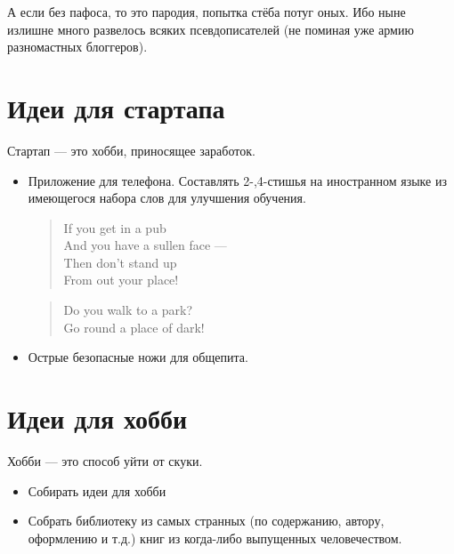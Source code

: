 \documentclass{ideas}
\begin{document}
 А если без пафоса, то это пародия, попытка стёба потуг оных. Ибо ныне излишне много развелось всяких псевдописателей (не поминая уже армию разномастных блоггеров).
\newpage
\section*{Идеи для стартапа}
Стартап --- это хобби, приносящее заработок.
\begin{itemize}
\item Приложение для телефона. Составлять 2-,4-стишья на иностранном языке из имеющегося набора слов для улучшения обучения.\\
\begin{flushleft}
\begin{verse}
If you get in a pub\\
And you have a sullen face ---\\ 
Then don't stand up\\
From out your place!
\end{verse}

\begin{verse}
Do you walk to a park?\\
Go round a place of dark! 
\end{verse}
\end{flushleft}
\item Острые безопасные ножи для общепита.
\end{itemize}
\newpage
\section*{Идеи для хобби}
Хобби --- это способ уйти от скуки.
\begin{itemize}
\item Собирать идеи для хобби
\item Собрать библиотеку из самых странных (по содержанию, автору, оформлению и т.д.) книг из когда-либо выпущенных человечеством.
\end{itemize}
\newpage
\end{document}
